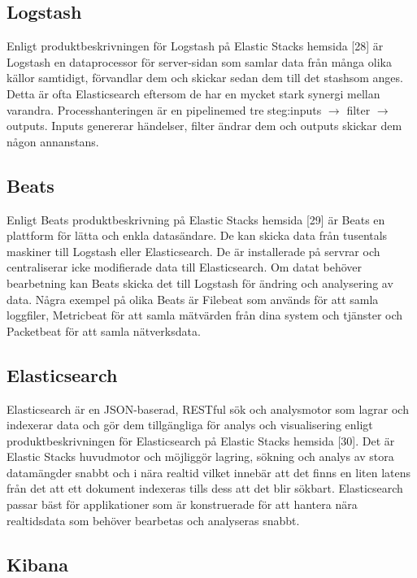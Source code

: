 \documentclass[12pt]{kththesis}
\begin{document}
\subsection{Logstash} 

Enligt produktbeskrivningen för Logstash på Elastic Stacks hemsida [28] är Logstash en dataprocessor för server-sidan som samlar data från många olika källor samtidigt, förvandlar dem och skickar sedan dem till det stashsom anges. Detta är ofta Elasticsearch eftersom de har en mycket stark synergi mellan varandra. Processhanteringen är en pipelinemed tre steg:inputs $\rightarrow$ filter $\rightarrow$ outputs. Inputs genererar händelser, filter ändrar dem och outputs skickar dem någon annanstans.

\subsection{Beats}

Enligt Beats produktbeskrivning på Elastic Stacks hemsida [29] är Beats en plattform för lätta och enkla datasändare. De kan skicka data från tusentals maskiner till Logstash eller Elasticsearch. De är installerade på servrar och centraliserar icke modifierade data till Elasticsearch. Om datat behöver bearbetning kan Beats skicka det till Logstash för ändring och analysering av data. Några exempel på olika Beats är Filebeat som används för att samla loggfiler, Metricbeat för att samla mätvärden från dina system och tjänster och Packetbeat för att samla nätverksdata. 

\subsection{Elasticsearch}

Elasticsearch är en JSON-baserad, RESTful sök och analysmotor som lagrar och indexerar data och gör dem tillgängliga för analys och visualisering enligt produktbeskrivningen för Elasticsearch på Elastic Stacks hemsida [30]. Det är Elastic Stacks huvudmotor och möjliggör lagring, sökning och analys av stora datamängder snabbt och i nära realtid vilket innebär att det finns en liten latens från det att ett dokument indexeras tills dess att det blir sökbart. Elasticsearch passar bäst för applikationer som är konstruerade för att hantera nära realtidsdata som behöver bearbetas och analyseras snabbt. 
 

\subsection{Kibana}
\end{document}
